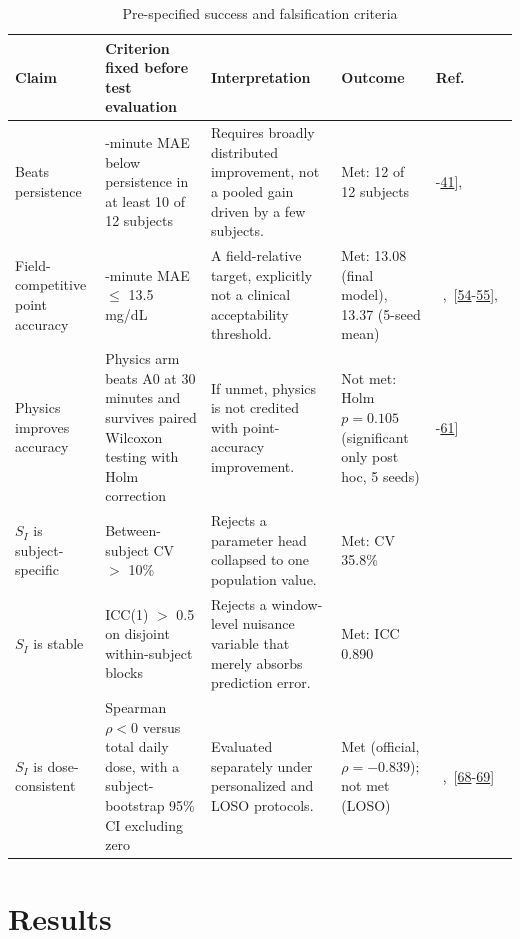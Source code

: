 \documentclass[journal]{IEEEtran}
\begin{document}
\begin{table}[t]
\centering
\caption{Pre-specified success and falsification criteria}
\label{tab:falsification}
\footnotesize
\begin{tabular}{>{\raggedright\arraybackslash}p{2.3cm}>{\raggedright\arraybackslash}p{4.4cm}>{\raggedright\arraybackslash}p{4.4cm}>{\raggedright\arraybackslash}p{3.0cm}>{\raggedright\arraybackslash}p{1.9cm}}
\toprule
Claim & Criterion fixed before test evaluation & Interpretation & Outcome & Ref. \\
\midrule
Beats persistence & 30-minute MAE below persistence in at least 10 of 12 subjects & Requires broadly distributed improvement, not a pooled gain driven by a few subjects. & Met: 12 of 12 subjects & [\hyperref[ref30label]{40}-\hyperref[ref31label]{41}],~\cite{ref57} \\
Field-competitive point accuracy & 30-minute MAE $\leq$ 13.5 mg/dL & A field-relative target, explicitly not a clinical acceptability threshold. & Met: 13.08 (final model), 13.37 (5-seed mean) &~\cite{ref31},~[\hyperref[ref43label]{54}-\hyperref[ref44label]{55}],~\cite{ref64} \\
Physics improves accuracy & Physics arm beats A0 at 30 minutes and survives paired Wilcoxon testing with Holm correction & If unmet, physics is not credited with point-accuracy improvement. & Not met: Holm $p = 0.105$ (significant only post hoc, 5 seeds) & [\hyperref[ref48label]{60}-\hyperref[ref49label]{61}] \\
$S_I$ is subject-specific & Between-subject CV $>$ 10\% & Rejects a parameter head collapsed to one population value. & Met: CV 35.8\% &~\cite{ref1,ref32} \\
$S_I$ is stable & ICC(1) $>$ 0.5 on disjoint within-subject blocks & Rejects a window-level nuisance variable that merely absorbs prediction error. & Met: ICC 0.890 &~\cite{ref50,ref76} \\
$S_I$ is dose-consistent & Spearman $\rho < 0$ versus total daily dose, with a subject-bootstrap 95\% CI excluding zero & Evaluated separately under personalized and LOSO protocols. & Met (official, $\rho = -0.839$); not met (LOSO) &~\cite{ref51},~[\hyperref[ref77label]{68}-\hyperref[ref78label]{69}] \\
\bottomrule
\end{tabular}
\end{table}


\section{Results}
\end{document}
